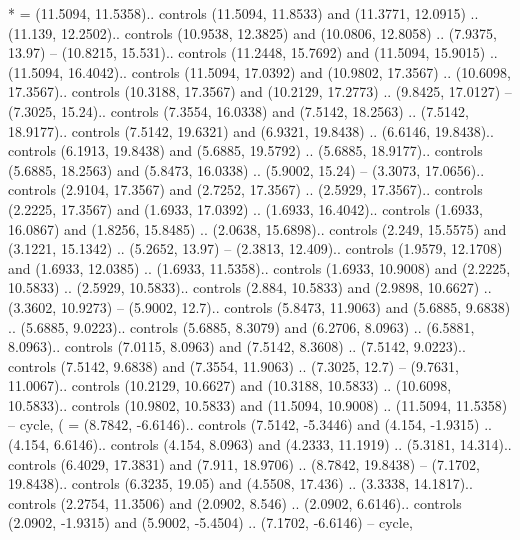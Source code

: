 {*} = {(11.5094, 11.5358).. controls (11.5094, 11.8533) and (11.3771, 12.0915) .. (11.139, 12.2502).. controls (10.9538, 12.3825) and (10.0806, 12.8058) .. (7.9375, 13.97) -- (10.8215, 15.531).. controls (11.2448, 15.7692) and (11.5094, 15.9015) .. (11.5094, 16.4042).. controls (11.5094, 17.0392) and (10.9802, 17.3567) .. (10.6098, 17.3567).. controls (10.3188, 17.3567) and (10.2129, 17.2773) .. (9.8425, 17.0127) -- (7.3025, 15.24).. controls (7.3554, 16.0338) and (7.5142, 18.2563) .. (7.5142, 18.9177).. controls (7.5142, 19.6321) and (6.9321, 19.8438) .. (6.6146, 19.8438).. controls (6.1913, 19.8438) and (5.6885, 19.5792) .. (5.6885, 18.9177).. controls (5.6885, 18.2563) and (5.8473, 16.0338) .. (5.9002, 15.24) -- (3.3073, 17.0656).. controls (2.9104, 17.3567) and (2.7252, 17.3567) .. (2.5929, 17.3567).. controls (2.2225, 17.3567) and (1.6933, 17.0392) .. (1.6933, 16.4042).. controls (1.6933, 16.0867) and (1.8256, 15.8485) .. (2.0638, 15.6898).. controls (2.249, 15.5575) and (3.1221, 15.1342) .. (5.2652, 13.97) -- (2.3813, 12.409).. controls (1.9579, 12.1708) and (1.6933, 12.0385) .. (1.6933, 11.5358).. controls (1.6933, 10.9008) and (2.2225, 10.5833) .. (2.5929, 10.5833).. controls (2.884, 10.5833) and (2.9898, 10.6627) .. (3.3602, 10.9273) -- (5.9002, 12.7).. controls (5.8473, 11.9063) and (5.6885, 9.6838) .. (5.6885, 9.0223).. controls (5.6885, 8.3079) and (6.2706, 8.0963) .. (6.5881, 8.0963).. controls (7.0115, 8.0963) and (7.5142, 8.3608) .. (7.5142, 9.0223).. controls (7.5142, 9.6838) and (7.3554, 11.9063) .. (7.3025, 12.7) -- (9.7631, 11.0067).. controls (10.2129, 10.6627) and (10.3188, 10.5833) .. (10.6098, 10.5833).. controls (10.9802, 10.5833) and (11.5094, 10.9008) .. (11.5094, 11.5358) -- cycle},
{(} = {(8.7842, -6.6146).. controls (7.5142, -5.3446) and (4.154, -1.9315) .. (4.154, 6.6146).. controls (4.154, 8.0963) and (4.2333, 11.1919) .. (5.3181, 14.314).. controls (6.4029, 17.3831) and (7.911, 18.9706) .. (8.7842, 19.8438) -- (7.1702, 19.8438).. controls (6.3235, 19.05) and (4.5508, 17.436) .. (3.3338, 14.1817).. controls (2.2754, 11.3506) and (2.0902, 8.546) .. (2.0902, 6.6146).. controls (2.0902, -1.9315) and (5.9002, -5.4504) .. (7.1702, -6.6146) -- cycle},
